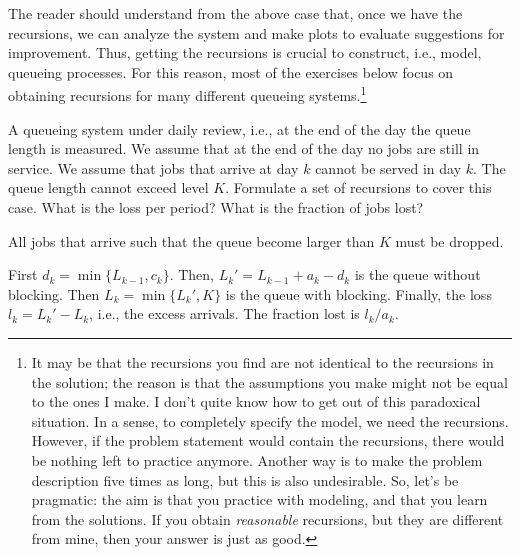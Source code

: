 The reader should understand from the above case that, once we have the recursions, we can analyze the system and make plots to evaluate suggestions for improvement.
Thus, getting the recursions is crucial to construct, i.e., model, queueing processes.
For this reason, most of the exercises below focus on obtaining recursions for many different queueing systems.\footnote{It may be that the recursions you find are not identical to the recursions in the solution; the reason is that the assumptions you make might not be equal to the ones I make.
  I don't quite know how to get out of this paradoxical situation.
  In a sense, to completely specify the model, we need the recursions.
  However, if the problem statement would contain the recursions, there would be nothing left to practice anymore.
  Another way is to make the problem description five times as long, but this is also undesirable.
  So, let's be pragmatic: the aim is that you practice with modeling, and that you learn from the solutions.
  If you obtain \emph{reasonable} recursions, but they are different from mine, then your answer is just as good.}

\begin{exercise} A queueing system
  under daily review, i.e., at the end of the day the queue length is
  measured. We assume that at the end of the day no jobs are still in
  service. We assume that jobs that arrive at day $k$ cannot be served
  in day $k$. The queue length cannot exceed level $K$.  Formulate a
  set of recursions to cover this case. What is the loss per period? What is the fraction of jobs lost?
\begin{solution}

    All jobs that arrive such that the queue become larger than $K$
    must be dropped. 

First $d_k = \min\{L_{k-1}, c_k\}$. Then, $L_k' = L_{k-1}+a_k-d_k$ is the queue without blocking. Then $L_k=\min\{L_k', K\}$ is the queue with blocking. Finally, the loss $l_k=L_k'-L_k$, i.e., the excess arrivals. The fraction lost is $l_k/a_k$. 
\end{solution}
\end{exercise}

